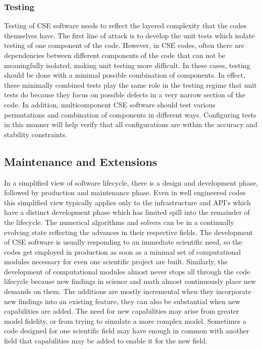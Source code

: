 \subsubsection{Testing}
\label{sec:testing}
Testing of CSE software needs to reflect the layered complexity that
the codes themselves have. The first line of attack is to develop the unit tests which isolate testing of one component of the code.
However, in CSE codes, often there are dependencies between different
components of the code that can not be meaningfully isolated, making unit testing more difficult. In these cases, testing should be done with a minimal possible combination of
components.  In effect, these
minimally combined tests play the same role in the testing regime that
unit tests do because they focus on possible defects in a very narrow
section of the code. In addition, multicomponent CSE software should test various 
permutations and combination of components in different ways. Configuring tests in this manner will help verify
that all configurations are within the accuracy and stability
constraints.  

\subsection{Maintenance and Extensions}
\label{sec:maintain}
In a simplified view of software lifecycle, there is a design and development phase,
followed by production and maintenance phase.  Even in well engineered
codes this simplified view typically applies only to the
infrastructure and API's which have a distinct development phase which
has limited spill into the remainder of the lifecycle. The numerical
algorithms and solvers can be in a continually evolving state
reflecting the advances in their respective fields.  
The development of CSE software is
usually responding to an immediate scientific need, so the codes get
employed in production as soon as a minimal set of computational
modules necessary for even one scientific project are
built.  Similarly, the development of computational modules almost
never stops all through the code lifecycle because new findings in science
and math almost continuously place new demands on them. The additions
are mostly incremental when they incorporate new findings into an
existing feature, they can also be substantial when new capabilities
are added. The need for new capabilities may arise from 
greater model fidelity, or from trying to simulate a more complex
model. Sometimes a code designed for one scientific field may have
enough in common with another field that capabilities may be added to
enable it for the new field.   

